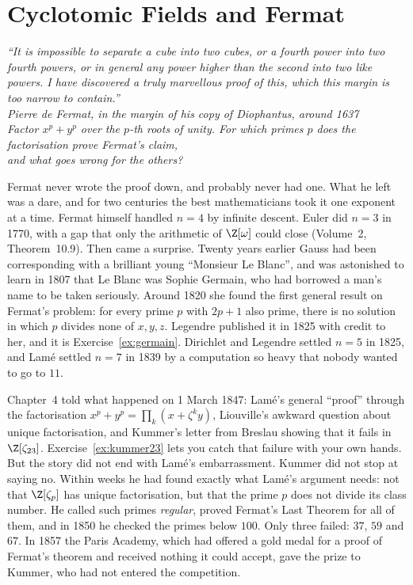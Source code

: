 \chapter{Cyclotomic Fields and Fermat}
\begin{center}\itshape
``It is impossible to separate a cube into two cubes, or a fourth power into two fourth powers, or in general any power
higher than the second into two like powers. I have discovered a truly marvellous proof of this, which this margin is
too narrow to contain.''\\[0.3em]
\upshape Pierre de Fermat, in the margin of his copy of Diophantus, around 1637\\[0.5em]
\itshape Factor $x^p+y^p$ over the $p$-th roots of unity. For which primes $p$ does the factorisation prove Fermat's claim,\\
and what goes wrong for the others?
\end{center}

Fermat never wrote the proof down, and probably never had one. What he left was a dare, and for two centuries the best
mathematicians took it one exponent at a time. Fermat himself handled $n=4$ by infinite descent. Euler did $n=3$ in 1770,
with a gap that only the arithmetic of $\Z[\omega]$ could close (Volume~2, Theorem~10.9). Then came a surprise. Twenty years
earlier Gauss had been corresponding with a brilliant young ``Monsieur Le Blanc'', and was astonished to learn in 1807 that
Le Blanc was Sophie Germain, who had borrowed a man's name to be taken seriously. Around 1820 she found the first general
result on Fermat's problem: for every prime $p$ with $2p+1$ also prime, there is no solution in which $p$ divides none of
$x,y,z$. Legendre published it in 1825 with credit to her, and it is Exercise~\ref{ex:germain}. Dirichlet and
Legendre settled $n=5$ in 1825, and Lamé settled $n=7$ in 1839 by a computation so heavy that nobody wanted to go to $11$.

Chapter~4 told what happened on 1 March 1847: Lamé's general ``proof'' through the factorisation $x^p+y^p=\prod_k
(x+\zeta^ky)$, Liouville's awkward question about unique factorisation, and Kummer's letter from Breslau showing that it
fails in $\Z[\zeta_{23}]$. Exercise~\ref{ex:kummer23} lets you catch that failure with your own hands. But the story did not
end with Lamé's embarrassment. Kummer did not stop at saying no. Within weeks he had found exactly what Lamé's argument
needs: not that $\Z[\zeta_p]$ has unique factorisation, but that the prime $p$ does not divide its class number. He called
such primes \emph{regular}, proved Fermat's Last Theorem for all of them, and in 1850 he checked the primes below $100$.
Only three failed: $37$, $59$ and $67$. In 1857 the Paris Academy, which had offered a gold medal for a proof of
Fermat's theorem and received nothing it could accept, gave the prize to Kummer, who had not entered the competition.

